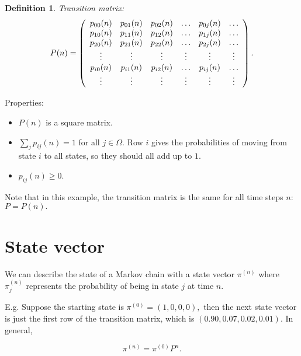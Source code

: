 \documentclass[10pt]{article}
\theoremstyle{plain}
\newtheorem{definition}[theorem]{Definition}
\theoremstyle{definition}
\theoremstyle{remark}
\newcommand{\0}{\varnothing}
\newcommand{\<}{\langle}
\renewcommand{\>}{\rangle}
\begin{document}
\begin{definition}
Transition matrix:
\[
P ( n ) = \left(
\begin{array}{ c c c c c c }
{ p _ { 00 } ( n ) } & { p _ { 01 } ( n ) } & { p _ { 02 } ( n ) } & { \dots } & { p _ { 0 j } ( n ) } & { \dots } \\
{ p _ { 10 } ( n ) } & { p _ { 11 } ( n ) } & { p _ { 12 } ( n ) } & { \dots } & { p _ { 1 j } ( n ) } & { \dots } \\
{ p _ { 20 } ( n ) } & { p _ { 21 } ( n ) } & { p _ { 22 } ( n ) } & { \dots } & { p _ { 2 j } ( n ) } & { \dots } \\
{ \vdots } & { \vdots } & { \vdots } & { \vdots } & { \vdots } & { \vdots } \\
{ p _ { i 0 } ( n ) } & { p _ { i 1 } ( n ) } & { p _ { i 2 } ( n ) } & { \dots } & { p _ { i j } ( n ) } & { \dots } \\
{ \vdots } & { \vdots } & { \vdots } & { \vdots } & { \vdots } & { \vdots }
\end{array}
\right).
\]
\end{definition}

Properties:

\begin{itemize}
\item \( P(n) \) is a square matrix.
\item \( \sum_{j} p_{ij} (n) = 1 \) for all \( j \in \Omega. \) Row \( i \) gives the probabilities of moving from state \( i \) to all states, so they should all add up to \( 1. \)
\item \( p_{ij}(n) \geq 0. \)
\end{itemize}


Note that in this example, the transition matrix is the same for all time steps \( n: \) \( P = P(n). \)

\section{State vector}


We can describe the state of a Markov chain with a state vector \( \pi^{(n)} \) where \( \pi^{(n)}_{j} \) represents the probability of being in state \( j \) at time \( n. \)

E.g. Suppose the starting state is \( \pi ^ { ( 0 ) } = ( 1,0,0,0 ), \) then the next state vector is just the first row of the transition matrix, which is \( (0.90, 0.07, 0.02, 0.01). \) In general,

\[
\pi ^ { ( n ) } = \pi ^ { ( 0 ) } P ^ { n }.
\]
\end{document}
